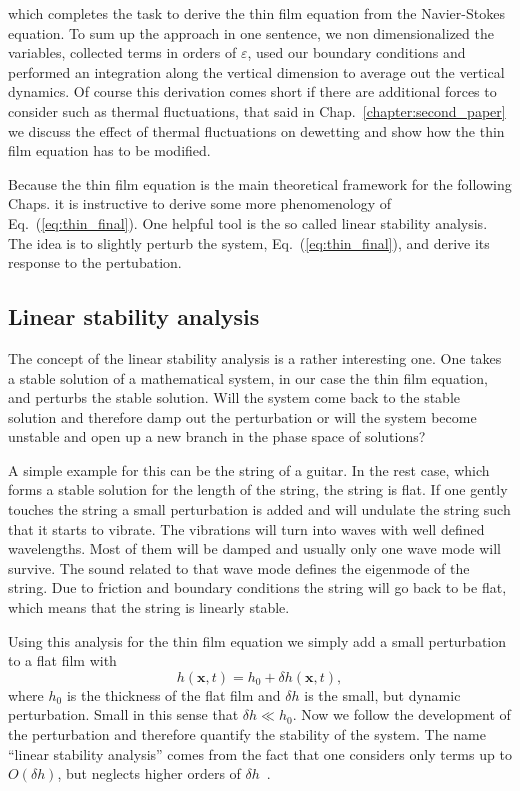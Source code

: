 which completes the task to derive the thin film equation from the Navier-Stokes equation. 
To sum up the approach in one sentence, we non dimensionalized the variables, collected terms in orders of $\varepsilon$, used our boundary conditions and performed an integration along the vertical dimension to average out the vertical dynamics.
Of course this derivation comes short if there are additional forces to consider such as thermal fluctuations, that said in Chap.~\ref{chapter:second_paper} we discuss the effect of thermal fluctuations on dewetting and show how the thin film equation has to be modified.

Because the thin film equation is the main theoretical framework for the following Chaps. it is instructive to derive some more phenomenology of Eq.~(\ref{eq:thin_final}).
One helpful tool is the so called linear stability analysis. 
The idea is to slightly perturb the system, Eq.~(\ref{eq:thin_final}), and derive its response to the pertubation.

\subsection{Linear stability analysis}
\label{susbsec:Lin_stab}
The concept of the linear stability analysis is a rather interesting one.
One takes a stable solution of a mathematical system, in our case the thin film equation, and perturbs the stable solution.
Will the system come back to the stable solution and therefore damp out the perturbation or will the system become unstable and open up a new branch in the phase space of solutions?

A simple example for this can be the string of a guitar.
In the rest case, which forms a stable solution for the length of the string, the string is flat.
If one gently touches the string a small perturbation is added and will undulate the string such that it starts to vibrate.
The vibrations will turn into waves with well defined wavelengths. 
Most of them will be damped and usually only one wave mode will survive.
The sound related to that wave mode defines the eigenmode of the string.
Due to friction and boundary conditions the string will go back to be flat, which means that the string is linearly stable.

Using this analysis for the thin film equation we simply add a small perturbation to a flat film with
\begin{equation}\label{eq:lin_stab_delta}
    h(\mathbf{x},t) = h_0 + \delta h(\mathbf{x},t),
\end{equation}
where $h_0$ is the thickness of the flat film and $\delta h$ is the small, but dynamic perturbation.
Small in this sense that $\delta h \ll h_0$.
Now we follow the development of the perturbation and therefore quantify the stability of the system.
The name ``linear stability analysis'' comes from the fact that one considers only terms up to $O(\delta h)$, but neglects higher orders of $\delta h$~\cite{laugesenLinearStabilitySteady2000}.

